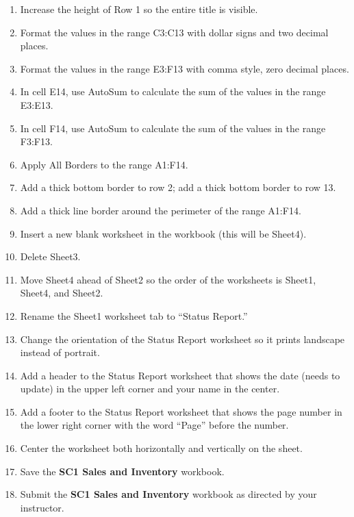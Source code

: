 \begin{enumerate}
	\item Increase the height of Row 1 so the entire title is visible.
	\item Format the values in the range \textsf{C3:C13} with dollar signs and two decimal places.
	\item Format the values in the range \textsf{E3:F13} with comma style, zero decimal places.
	\item In cell \textsf{E14}, use AutoSum to calculate the sum of the values in the range \textsf{E3:E13}.
	\item In cell \textsf{F14}, use AutoSum to calculate the sum of the values in the range \textsf{F3:F13}.
	\item Apply All Borders to the range \textsf{A1:F14}.
	\item Add a thick bottom border to row 2; add a thick bottom border to row 13.
	\item Add a thick line border around the perimeter of the range \textsf{A1:F14}.
	\item Insert a new blank worksheet in the workbook (this will be Sheet4).
	\item Delete Sheet3.
	\item Move Sheet4 ahead of Sheet2 so the order of the worksheets is Sheet1, Sheet4, and Sheet2.
	\item Rename the Sheet1 worksheet tab to ``Status Report.''
	\item Change the orientation of the Status Report worksheet so it prints landscape instead of portrait.
	\item Add a header to the Status Report worksheet that shows the date (needs to update) in the upper left corner and your name in the center.
	\item Add a footer to the Status Report worksheet that shows the page number in the lower right corner with the word ``Page'' before the number.
	\item Center the worksheet both horizontally and vertically on the sheet.
	\item Save the \textbf{SC1 Sales and Inventory} workbook.
	\item Submit the \textbf{SC1 Sales and Inventory} workbook as directed by your instructor.

\end{enumerate}
